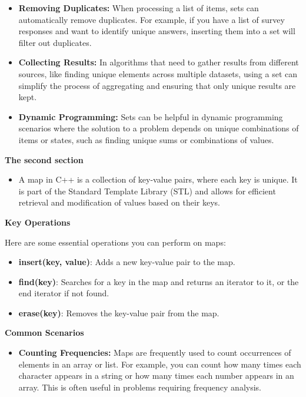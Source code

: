 \documentclass[12pt, letterpaper]{report}
\begin{document}
\begin{enumerate}
\begin{itemize}
\item \textbf{Removing Duplicates:} When processing a list of items, sets can automatically remove duplicates. For example, if you have a list of survey responses and want to identify unique answers, inserting them into a set will filter out duplicates.

\item \textbf{Collecting Results:} In algorithms that need to gather results from different sources, like finding unique elements across multiple datasets, using a set can simplify the process of aggregating and ensuring that only unique results are kept.

\item \textbf{Dynamic Programming:} Sets can be helpful in dynamic programming scenarios where the solution to a problem depends on unique combinations of items or states, such as finding unique sums or combinations of values.
    \end{itemize}
\textbf{The second section}
\begin{itemize}
	\item A map in C++ is a collection of key-value pairs, where each key is unique. It is part of the Standard Template Library (STL) and allows for efficient retrieval and modification of values based on their keys.
\end{itemize}

 
\textbf{Key Operations}

Here are some essential operations you can perform on maps:

\begin{itemize}
    \item \textbf{insert(key, value)}: Adds a new key-value pair to the map.
    \item \textbf{find(key)}: Searches for a key in the map and returns an iterator to it, or the end iterator if not found.
    \item \textbf{erase(key)}: Removes the key-value pair from the map.
\end{itemize}

\textbf{Common Scenarios}
\begin{itemize}

\item \textbf{Counting Frequencies:} Maps are frequently used to count occurrences of elements in an array or list. For example, you can count how many times each character appears in a string or how many times each number appears in an array. This is often useful in problems requiring frequency analysis.


\end{itemize}
\end{enumerate}
\end{document}
